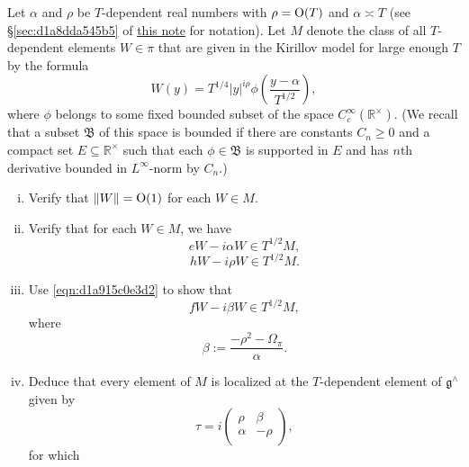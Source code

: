 \documentclass[reqno]{amsart} 
\numberwithin{equation}{section}
\begin{document}
\begin{exercise}
  Let $\alpha$ and $\rho$ be $T$-dependent real numbers with $\rho = \operatorname{O}(T)$ and $\alpha \asymp T$ (see \S\ref{sec:d1a8dda545b5} of \href{20230522T150333__microlocal-localized-vectors.pdf}{this note} for notation).  Let $M$ denote the class of all $T$-dependent elements $W \in \pi$ that are given in the Kirillov model for large enough $T$ by the formula
  \begin{equation}\label{eqn:d1aa012dc1aa}
    W(y) =
    T^{1/4}
    \lvert y \rvert^{i \rho }
    \phi \left( \frac{y - \alpha}{T^{1/2} } \right),
  \end{equation}
  where $\phi$ belongs to some fixed bounded subset of the space $C_c^\infty(\mathbb{R}^\times)$.  (We recall that a subset $\mathfrak{B}$ of this space is bounded if there are constants $C_n \geq 0$ and a compact set $E \subseteq \mathbb{R}^\times$ such that each $\phi \in \mathfrak{B}$ is supported in $E$ and has $n$th derivative bounded in $L^\infty$-norm by $C_n$.)
  \begin{enumerate}[(i)]
  \item Verify that $\lVert W \rVert = \operatorname{O}(1)$ for each $W \in M$.
  \item Verify that for each $W \in M$, we have
    \begin{equation*}
      e W - i \alpha  W \in T^{1/2} M,
    \end{equation*}
    \begin{equation*}
      h W
      - i \rho W
      \in T^{1/2} M.
    \end{equation*}
  \item Use \eqref{eqn:d1a915c0e3d2} to show that
    \begin{equation*}
      f W - i \beta W \in T^{1/2} M,
    \end{equation*}
    where
    \begin{equation*}
      \beta := \frac{-\rho^2 - \Omega_\pi}{\alpha}.
    \end{equation*}    
  \item Deduce that every element of $M$ is localized at the $T$-dependent element of $\mathfrak{g}^\wedge$ given by
    \begin{equation*}
      \tau = i 
      \begin{pmatrix}
        \rho  & \beta \\
        \alpha & -\rho \\
      \end{pmatrix},
    \end{equation*}
    for which
    \begin{equation*}

\end{equation*}
\end{enumerate}
\end{exercise}
\end{document}
